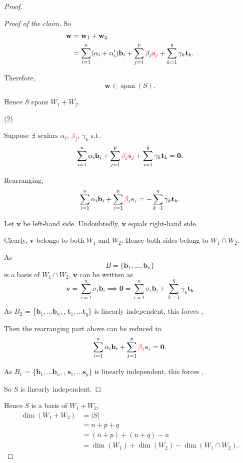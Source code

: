 \documentclass[12pt]{article}
\begin{document}
\begin{proof}
\begin{proof}[Proof of the claim]
So
\[
\begin{aligned}
\mathbf{w}
&=
\mathbf{w}_1+\mathbf{w}_2\\
&=
\sum_{i=1}^{n}(\alpha_i+\alpha_i')\mathbf{b}_i+\sum_{j=1}^{p} \beta_j\textcolor{red}{\mathbf{s}_j} + \sum_{k=1}^{q}\gamma_k\mathbf{t}_k.
\end{aligned}
\]

Therefore,
\[
\mathbf{w}\in\operatorname{span}(S).
\]

Hence $S$ spans $W_1+W_2$.

\medskip

(2) 

Suppose $\exists$ scalars $\alpha_i$, \textcolor{red}{$\beta_j$}, $\gamma_k$ s.t.
\[
\sum_{i=1}^{n}\alpha_i\mathbf{b}_i + \sum_{j=1}^{p}\textcolor{red}{\beta_j\mathbf{s}_j} + \sum_{i=1}^{q}\gamma_k\mathbf{t}_k= \mathbf0.
\]

Rearranging,
\[
\sum_{i=1}^{n}\alpha_i\mathbf{b}_i + \sum_{j=1}^{p}\textcolor{red}{\beta_j\mathbf{s}_j} = -\sum_{k=1}^{q}\gamma_k\mathbf{t}_k.
\]

Let $\mathbf{v}$ be left-hand side. Undoubtedly, $\mathbf{v}$ equals right-hand side.

Clearly, $\mathbf{v}$ belongs to both $W_1$ and $W_2$. Hence both sides belong to $W_1\cap W_2$.

As
\[
B=\{\mathbf{b}_1,\ldots,\mathbf{b}_n\}
\]
is a basis of $W_1\cap W_2$, $\mathbf{v}$ can be written as
\[
\mathbf{v} = \sum_{i=1}^{n}\sigma_i\mathbf{b}_i \implies \mathbf{0} =  \sum_{i=1}^{n}\sigma_i\mathbf{b}_i + \sum_{k=1}^{q}\gamma_k\mathbf{t_k}
\]

As $B_2$ = \{$\mathbf{b}_1, \ldots \mathbf{b}_n,$, $\mathbf{t}_1, \ldots \mathbf{t}_q$\} is linearly independent,
this forces , 

Then the rearranging part above can be reduced to
\[
\sum_{i=1}^{n}\alpha_i\mathbf{b}_i + \sum_{j=1}^{p}\textcolor{red}{\beta_j\mathbf{s}_j} = \mathbf{0}.
\]

As $B_1$ = \{$\mathbf{b}_1, \ldots \mathbf{b}_n,$, $\mathbf{s}_1, \ldots \mathbf{s}_p$\} is linearly independent,
this forces , 

So $S$ is linearly independent.

\end{proof}

\bigskip

Hence $S$ is a basis of $W_1+W_2$,
\[
\begin{aligned}
\dim(W_1+W_2)
&=
|S|\\
&=
n+p+q\\
&=
(n+p)+(n+q)-n\\
&=
\dim(W_1)+\dim(W_2)-\dim(W_1\cap W_2).
\end{aligned}
\]

\end{proof}
\end{document}
